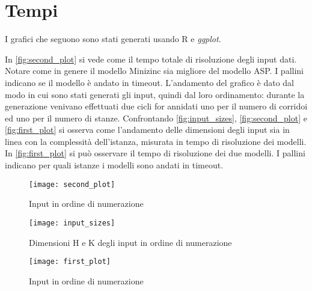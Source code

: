 
\section{Tempi}
I grafici che seguono sono stati generati usando R e \emph{ggplot}.

\noindent
In \autoref{fig:second_plot} si vede come il tempo totale di risoluzione degli input dati.
Notare come in genere il modello Minizinc sia migliore del modello ASP.
I pallini indicano se il modello è andato in timeout.
L'andamento del grafico è dato dal modo in cui sono stati generati gli input, quindi dal loro ordinamento: durante la generazione venivano effettuati due cicli for annidati uno per il numero di corridoi ed uno per il numero di stanze.
Confrontando \autoref{fig:input_sizes}, \autoref{fig:second_plot} e \autoref{fig:first_plot} si osserva come l'andamento delle dimensioni degli input sia in linea con la complessità dell'istanza, misurata in tempo di risoluzione dei modelli.
In \autoref{fig:first_plot} si può  osservare il tempo di risoluzione dei due modelli.
I pallini indicano per quali istanze i modelli sono andati in timeout.
\begin{figure}[ht]
  \centering
  \texttt{[image: second\_plot]}
  \caption{Input in ordine di numerazione}
  \label{fig:second_plot}
\end{figure}
\begin{figure}[ht]
  \centering
  \texttt{[image: input\_sizes]}
  \caption{Dimensioni H e K degli input in ordine di numerazione}
  \label{fig:input_sizes}
\end{figure}

\begin{figure}[ht]
  \centering
  \texttt{[image: first\_plot]}
  \caption{Input in ordine di numerazione}
  \label{fig:first_plot}
\end{figure}
\cleardoublepage

